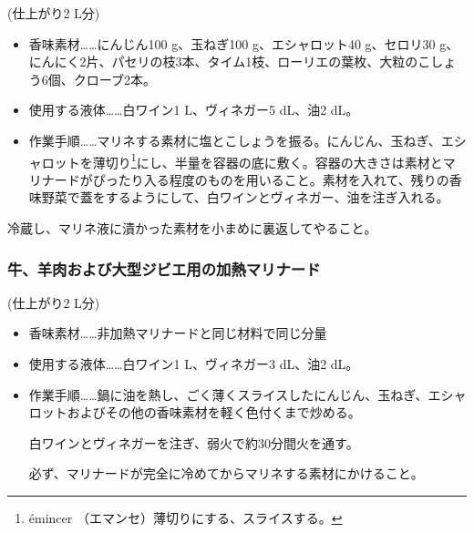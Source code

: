 \begin{recette}
(仕上がり2 L分)

\begin{itemize}
\item
  香味素材\ldots{}\ldots{}にんじん100 g、玉ねぎ100 g、エシャロット40
  g、セロリ30
  g、にんにく2片、パセリの枝3本、タイム1枝、ローリエの葉\undemi{}枚、大粒のこしょう6個、クローブ2本。
\item
  使用する液体\ldots{}\ldots{}白ワイン1\unquart{} L、ヴィネガー5
  dL、油2\undemi{} dL。
\item
  作業手順\ldots{}\ldots{}マリネする素材に塩とこしょうを振る。にんじん、玉ねぎ、エシャロットを薄切り\footnote{émincer
    （エマンセ）薄切りにする、スライスする。}にし、半量を容器の底に敷く。容器の大きさは素材とマリナードがぴったり入る程度のものを用いること。素材を入れて、残りの香味野菜で蓋をするようにして、白ワインとヴィネガー、油を注ぎ入れる。
\end{itemize}

冷蔵し、マリネ液に漬かった素材を小まめに裏返してやること。

\hypertarget{marinade-cuite-pour-viandes-de-boucherie-ou-venaison}{%
\subsubsection{牛、羊肉および大型ジビエ用の加熱マリナード}\label{marinade-cuite-pour-viandes-de-boucherie-ou-venaison}}



(仕上がり2 L分)

\begin{itemize}
\item
  香味素材\ldots{}\ldots{}非加熱マリナードと同じ材料で同じ分量
\item
  使用する液体\ldots{}\ldots{}白ワイン1\undemi{} L、ヴィネガー3
  dL、油2\undemi{} dL。
\item
  作業手順\ldots{}\ldots{}鍋に油を熱し、ごく薄くスライスしたにんじん、玉ねぎ、エシャロットおよびその他の香味素材を軽く色付くまで炒める。

  白ワインとヴィネガーを注ぎ、弱火で約30分間火を通す。

  必ず、マリナードが完全に冷めてからマリネする素材にかけること。
\end{itemize}


\end{recette}
